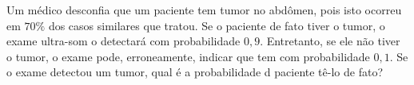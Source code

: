 %
%


\begin{exercicioBanco}[\valorquestao]
Um médico desconfia que um paciente tem tumor no abdômen, pois isto ocorreu em \(70\%\) dos casos similares que tratou. Se o paciente de fato tiver o tumor, o exame ultra-som o detectará com probabilidade \(0,9\). Entretanto, se ele não tiver o tumor, o exame pode, erroneamente, indicar que tem com probabilidade \(0,1\). Se o exame detectou um tumor, qual é a probabilidade d paciente tê-lo de fato?
\end{exercicioBanco}

